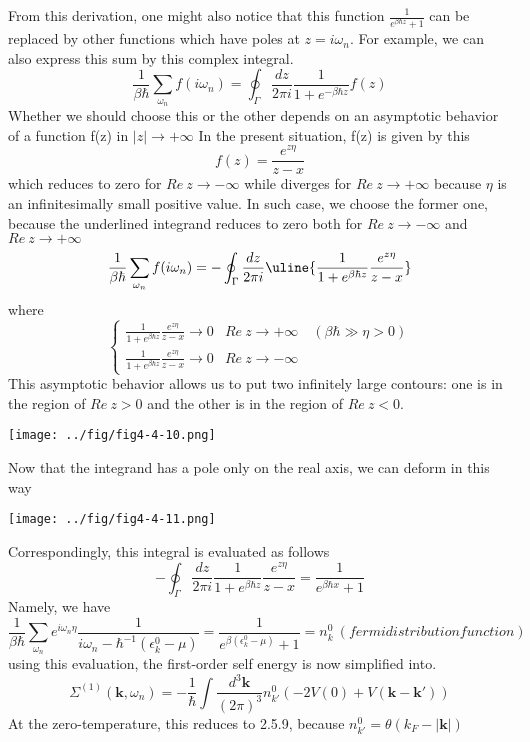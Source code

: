 From this derivation, one might also notice that this function $\frac{1}{e^{\beta\hbar z}+1}$ can be replaced by other functions which have poles at $z=i\omega_n$.
For example, we can also express this sum by this complex integral.
\[
\frac{1}{\beta\hbar}\sum_{\omega_n}f(i\omega_n)=\oint_\Gamma \frac{dz}{2\pi i} \frac{1}{1+e^{-\beta\hbar z}}f(z) \tag{$4.4.22^\prime$}
\]
Whether we should choose this or the other depends on an asymptotic behavior of a function f(z) in $|z|\rightarrow+\infty$
In the present situation, f(z) is given by this
\[
f(z)=\frac{e^{z\eta}}{z-x}
\]
which reduces to zero for $Re\ z\rightarrow-\infty$ while diverges for $Re\ z\rightarrow+\infty$ because $\eta$ is an infinitesimally small positive value.
In such case, we choose the former one, because the underlined integrand reduces to zero both for $Re\ z\rightarrow-\infty$ and $Re\ z\rightarrow+\infty$
\[
\frac{1}{\beta\hbar}\sum_{\omega_n}f(i\omega_n)=-\oint_\Gamma\frac{dz}{2\pi i} \uline{\frac{1}{1+e^{\beta\hbar z}}\frac{e^{z\eta}}{z-x}}
\]
where
\[
\begin{cases}
\frac{1}{1+e^{\beta\hbar z}}\frac{e^{z\eta}}{z-x}\rightarrow 0 & Re\ z\rightarrow+\infty\quad(\beta\hbar\gg\eta> 0)\\
\frac{1}{1+e^{\beta\hbar z}}\frac{e^{z\eta}}{z-x}\rightarrow 0 & Re\ z\rightarrow-\infty
\end{cases}
\]
This asymptotic behavior allows us to put two infinitely large contours: one is in the region of $Re\ z> 0$ and the other is in the region of $Re\ z< 0$.
\begin{center}
\texttt{[image: ../fig/fig4-4-10.png]}
\end{center}
Now that the integrand has a pole only on the real axis, we can deform in this way
\begin{center}
\texttt{[image: ../fig/fig4-4-11.png]}
\end{center}
Correspondingly, this integral is evaluated as follows
\begin{equation}
-\oint_\Gamma\frac{dz}{2\pi i} \frac{1}{1+e^{\beta\hbar z}}\frac{e^{z\eta}}{z-x}=\frac{1}{e^{\beta\hbar x}+1}
\end{equation}
Namely, we have
\[
\frac{1}{\beta\hbar}\sum_{\omega_n} e^{i\omega_n\eta} \frac{1}{i\omega_n-\hbar^{-1}(\epsilon_k^0-\mu)}=\frac{1}{e^{\beta(\epsilon_k^0-\mu)}+1}=n_k^0\ (fermi distribution function) \tag{$4.4.23^\prime$}
\]
using this evaluation, the first-order self energy is now simplified into.
\begin{equation}
\Sigma^{(1)} (\mathbf{k},\omega_n)=-\frac{1}{\hbar} \int \frac{d^3\mathbf{k}}{(2\pi)^3} n_{k'}^0 \left(-2V(0)+V(\mathbf{k}-\mathbf{k}')\right)
\end{equation}
At the zero-temperature, this reduces to 2.5.9, because $n_{k'}^0=\theta(k_F-|\mathbf{k}|)$

